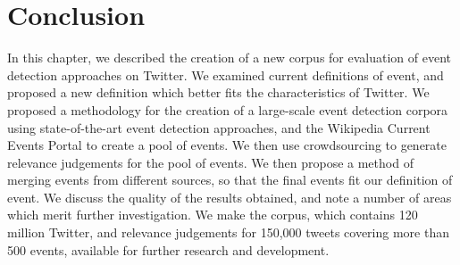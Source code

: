 

\section{Conclusion}
\label{sec:conclusion}
\label{collection:sec:conclusion}
In this chapter, we described the creation of a new corpus for evaluation of event detection approaches on Twitter.
We examined current definitions of event, and proposed a new definition which better fits the characteristics of Twitter.
We proposed a methodology for the creation of a large-scale event detection corpora using state-of-the-art event detection approaches, and the Wikipedia Current Events Portal to create a pool of events.
We then use crowdsourcing to generate relevance judgements for the pool of events.
We then propose a method of merging events from different sources, so that the final events fit our definition of event.
We discuss the quality of the results obtained, and note a number of areas which merit further investigation.
We make the corpus, which contains 120 million Twitter, and relevance judgements for 150,000 tweets covering more than 500 events, available for further research and development.